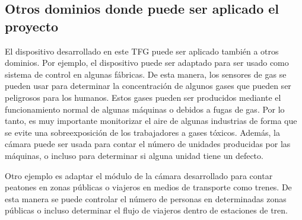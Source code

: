 \subsection{Otros dominios donde puede ser aplicado el proyecto}
El dispositivo desarrollado en este \ac{TFG} puede ser aplicado también a otros dominios. Por ejemplo, el dispositivo puede ser adaptado para ser usado como sistema de control en algunas fábricas. De esta manera, los sensores de gas se pueden usar para determinar la concentración de algunos gases que pueden ser peligrosos para los humanos. Estos gases pueden ser producidos mediante el funcionamiento normal de algunas máquinas o debidos a fugas de gas. Por lo tanto, es muy importante monitorizar el aire de algunas industrias de forma que se evite una sobreexposición de los trabajadores a gases tóxicos. Además, la cámara puede ser usada para contar el número de unidades producidas por las máquinas, o incluso para determinar si alguna unidad tiene un defecto.

Otro ejemplo es adaptar el módulo de la cámara desarrollado para contar peatones en zonas públicas o viajeros en medios de transporte como trenes. De esta manera se puede controlar el número de personas en determinadas zonas públicas o incluso determinar el flujo de viajeros dentro de estaciones de tren.


